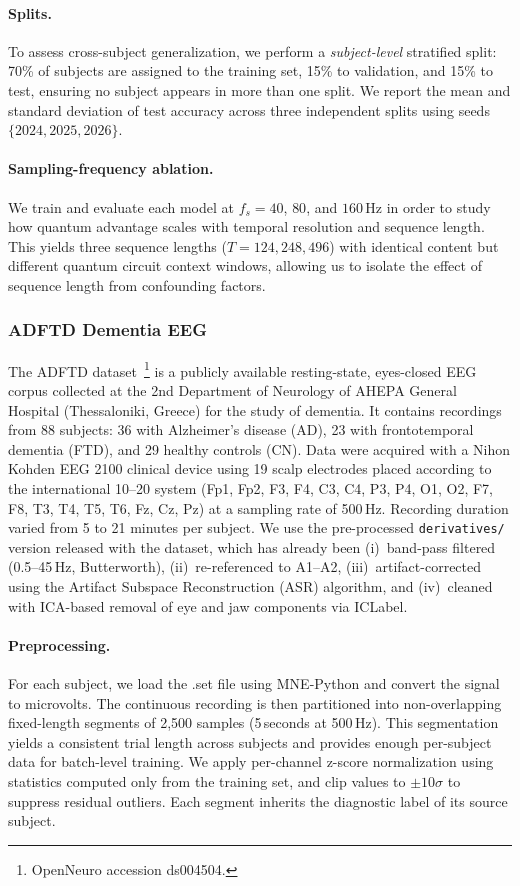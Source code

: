 \paragraph{Splits.}
To assess cross-subject generalization, we perform a \emph{subject-level} stratified split: 70\% of subjects are assigned to the training set, 15\% to validation, and 15\% to test, ensuring no subject appears in more than one split.
We report the mean and standard deviation of test accuracy across three independent splits using seeds $\{2024, 2025, 2026\}$.

\paragraph{Sampling-frequency ablation.}
We train and evaluate each model at $f_s = 40$, $80$, and $160$\,Hz in order to study how quantum advantage scales with temporal resolution and sequence length.
This yields three sequence lengths ($T = 124, 248, 496$) with identical content but different quantum circuit context windows, allowing us to isolate the effect of sequence length from confounding factors.

\subsubsection{ADFTD Dementia EEG}
\label{sec:adftd}

The ADFTD dataset~\cite{miltiadous2023dataset}\footnote{OpenNeuro accession ds004504.} is a publicly available resting-state, eyes-closed EEG corpus collected at the 2nd Department of Neurology of AHEPA General Hospital (Thessaloniki, Greece) for the study of dementia.
It contains recordings from 88 subjects: 36 with Alzheimer's disease (AD), 23 with frontotemporal dementia (FTD), and 29 healthy controls (CN).
Data were acquired with a Nihon Kohden EEG 2100 clinical device using 19 scalp electrodes placed according to the international 10--20 system (Fp1, Fp2, F3, F4, C3, C4, P3, P4, O1, O2, F7, F8, T3, T4, T5, T6, Fz, Cz, Pz) at a sampling rate of 500\,Hz.
Recording duration varied from 5 to 21 minutes per subject.
We use the pre-processed \texttt{derivatives/} version released with the dataset, which has already been (i)~band-pass filtered (0.5--45\,Hz, Butterworth), (ii)~re-referenced to A1--A2, (iii)~artifact-corrected using the Artifact Subspace Reconstruction (ASR) algorithm, and (iv)~cleaned with ICA-based removal of eye and jaw components via ICLabel.

\paragraph{Preprocessing.}
For each subject, we load the .set file using MNE-Python and convert the signal to microvolts.
The continuous recording is then partitioned into non-overlapping fixed-length segments of 2{,}500 samples (5\,seconds at 500\,Hz).
This segmentation yields a consistent trial length across subjects and provides enough per-subject data for batch-level training.
We apply per-channel z-score normalization using statistics computed only from the training set, and clip values to $\pm 10\sigma$ to suppress residual outliers.
Each segment inherits the diagnostic label of its source subject.

